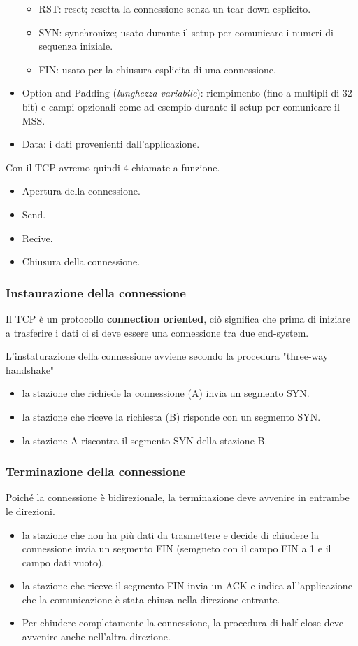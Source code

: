 \documentclass[oneside,a4paper,11pt]{book}
\theoremstyle{italicstyle}
\theoremstyle{normStyle}
\begin{document}
\begin{itemize}
\begin{itemize}
    \item RST: reset; resetta la connessione senza un tear down esplicito.
    \item SYN: synchronize; usato durante il setup per comunicare i numeri di sequenza iniziale.
    \item FIN: usato per la chiusura esplicita di una connessione.
  \end{itemize}
  \item Option and Padding (\textit{lunghezza variabile}):  riempimento (fino a multipli di 32 bit) e campi 
  opzionali come ad esempio durante il setup per comunicare il MSS.
  \item Data: i dati provenienti dall’applicazione.
\end{itemize}
Con il TCP avremo quindi 4 chiamate a funzione.
\begin{itemize}
  \item Apertura della connessione.
  \item Send.
  \item Recive.
  \item Chiusura della connessione.
\end{itemize}
\subsubsection{Instaurazione della connessione}
Il TCP è un protocollo \textbf{connection oriented}, ciò significa 
che prima di iniziare a trasferire i dati ci si deve essere 
una connessione tra due end-system.

L'instaturazione della connessione avviene secondo la procedura 
"three-way handshake"
\begin{itemize}
  \item la stazione che richiede la connessione (A) invia un segmento SYN.
  \item la stazione che riceve la richiesta (B) risponde con un segmento
  SYN.
  \item la stazione A riscontra il segmento SYN della stazione B.
\end{itemize}
\subsubsection{Terminazione della connessione}
Poiché la connessione è bidirezionale, la terminazione deve avvenire in entrambe le direzioni.
\begin{itemize}
  \item la stazione che non ha più dati da trasmettere e decide
  di chiudere la connessione invia un segmento FIN (semgneto con il campo FIN a 1 e il campo dati vuoto).
  \item la stazione che riceve il segmento FIN invia un ACK e indica all'applicazione che la comunicazione 
  è stata chiusa nella direzione entrante.
  \item Per chiudere completamente la connessione, la procedura 
  di half close deve avvenire anche nell'altra direzione.
\end{itemize}
\end{document}
